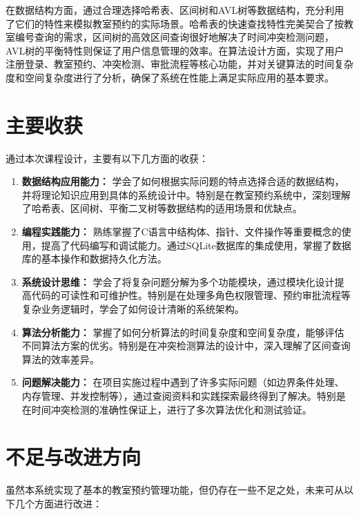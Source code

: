 \documentclass[a4paper,12pt,twoside]{ctexrep}
\begin{document}
在数据结构方面，通过合理选择哈希表、区间树和AVL树等数据结构，充分利用了它们的特性来模拟教室预约的实际场景。哈希表的快速查找特性完美契合了按教室编号查询的需求，区间树的高效区间查询很好地解决了时间冲突检测问题，AVL树的平衡特性则保证了用户信息管理的效率。在算法设计方面，实现了用户注册登录、教室预约、冲突检测、审批流程等核心功能，并对关键算法的时间复杂度和空间复杂度进行了分析，确保了系统在性能上满足实际应用的基本要求。

\section{主要收获}

通过本次课程设计，主要有以下几方面的收获：

\begin{enumerate}
  \item \textbf{数据结构应用能力：} 学会了如何根据实际问题的特点选择合适的数据结构，并将理论知识应用到具体的系统设计中。特别是在教室预约系统中，深刻理解了哈希表、区间树、平衡二叉树等数据结构的适用场景和优缺点。
  \item \textbf{编程实践能力：} 熟练掌握了C语言中结构体、指针、文件操作等重要概念的使用，提高了代码编写和调试能力。通过SQLite数据库的集成使用，掌握了数据库的基本操作和数据持久化方法。
  \item \textbf{系统设计思维：} 学会了将复杂问题分解为多个功能模块，通过模块化设计提高代码的可读性和可维护性。特别是在处理多角色权限管理、预约审批流程等复杂业务逻辑时，学会了如何设计清晰的系统架构。
  \item \textbf{算法分析能力：} 掌握了如何分析算法的时间复杂度和空间复杂度，能够评估不同算法方案的优劣。特别是在冲突检测算法的设计中，深入理解了区间查询算法的效率差异。
  \item \textbf{问题解决能力：} 在项目实施过程中遇到了许多实际问题（如边界条件处理、内存管理、并发控制等），通过查阅资料和实践探索最终得到了解决。特别是在时间冲突检测的准确性保证上，进行了多次算法优化和测试验证。
\end{enumerate}

\section{不足与改进方向}

虽然本系统实现了基本的教室预约管理功能，但仍存在一些不足之处，未来可从以下几个方面进行改进：
\end{document}
